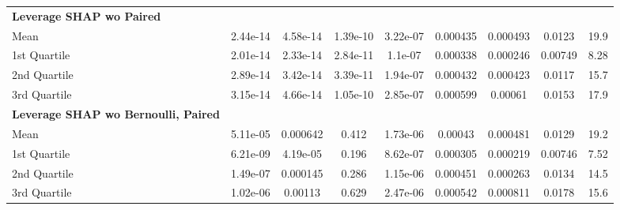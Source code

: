 {\begin{tabular} {lcccccccc}
\addlinespace[1ex] 
\textbf{Leverage SHAP wo Paired} &  &  &  &  &  &  &  &  \\ 
\hspace{7pt}Mean & \cellcolor{gold!60}2.44e-14 & \cellcolor{silver!60}4.58e-14 & \cellcolor{gold!60}1.39e-10 & 3.22e-07 & 0.000435 & 0.000493 & 0.0123 & 19.9 \\ 
\hspace{7pt}1st Quartile & \cellcolor{silver!60}2.01e-14 & \cellcolor{bronze!60}2.33e-14 & \cellcolor{bronze!60}2.84e-11 & 1.1e-07 & 0.000338 & 0.000246 & 0.00749 & 8.28 \\ 
\hspace{7pt}2nd Quartile & \cellcolor{gold!60}2.89e-14 & \cellcolor{silver!60}3.42e-14 & \cellcolor{gold!60}3.39e-11 & 1.94e-07 & 0.000432 & 0.000423 & 0.0117 & 15.7 \\ 
\hspace{7pt}3rd Quartile & \cellcolor{silver!60}3.15e-14 & \cellcolor{silver!60}4.66e-14 & \cellcolor{gold!60}1.05e-10 & \cellcolor{bronze!60}2.85e-07 & 0.000599 & 0.00061 & 0.0153 & 17.9 \\ 
\addlinespace[1ex] 
\textbf{Leverage SHAP wo Bernoulli, Paired} &  &  &  &  &  &  &  &  \\ 
\hspace{7pt}Mean & 5.11e-05 & 0.000642 & 0.412 & 1.73e-06 & 0.00043 & 0.000481 & 0.0129 & 19.2 \\ 
\hspace{7pt}1st Quartile & 6.21e-09 & 4.19e-05 & 0.196 & 8.62e-07 & 0.000305 & 0.000219 & 0.00746 & 7.52 \\ 
\hspace{7pt}2nd Quartile & 1.49e-07 & 0.000145 & 0.286 & 1.15e-06 & 0.000451 & 0.000263 & 0.0134 & 14.5 \\ 
\hspace{7pt}3rd Quartile & 1.02e-06 & 0.00113 & 0.629 & 2.47e-06 & 0.000542 & 0.000811 & 0.0178 & 15.6 \\ 
\bottomrule
\end{tabular}}